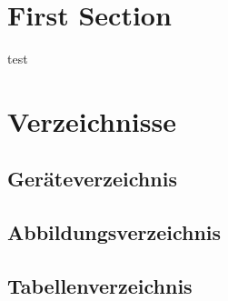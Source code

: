 \section{First Section}     %

\blindtext
test

\newpage                    %
\section{Verzeichnisse}

\subsection{Geräteverzeichnis}

\subsection{Abbildungsverzeichnis}
\listoffigures

\subsection{Tabellenverzeichnis}
\listoftables               %